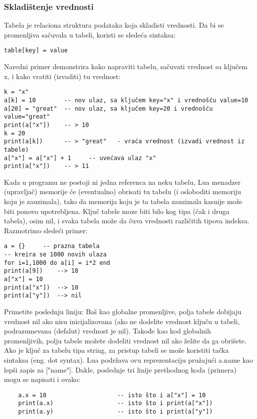 \documentclass[a4paper]{article}
\begin{document}
\subsubsection{Skladištenje vrednosti}
Tabela je relaciona struktura podataka koja skladisti vrednosti. Da bi se promenljiva sačuvala u tabeli, koristi se sledeća sintaksa:
\begin{verbatim}
table[key] = value
\end{verbatim}
Naredni primer demonstrira kako napraviti tabelu, sačuvati vrednost sa ključem x, i kako vratiti (izvaditi) tu vrednost:
\begin{verbatim}
k = "x"
a[k] = 10        -- nov ulaz, sa ključem key="x" i vrednošću value=10
a[20] = "great"  -- nov ulaz, sa ključem key=20 i vrednošću value="great"
print(a["x"])    -- > 10
k = 20
print(a[k])      -- > "great"	- vraća vrednost (izvadi vrednost iz tabele)
a["x"] = a["x"] + 1     -- uvećava ulaz "x"
print(a["x"])    -- > 11
\end{verbatim}
Kada u programu ne postoji ni jedna referenca na neku tabelu, Lua menadzer (upravljač) memorije će (eventualno) obrisati tu tabelu (i osloboditi memoriju koju je zauzimala), tako da memorija koju je ta tabela zauzimala kasnije može biti ponovo upotrebljena.
Ključ tabele moze biti bilo kog tipa (čak i druga tabela), osim nil, i svaka tabela može da čuva vrednosti različitih tipova indeksa. Razmotrimo sledeći primer:
\begin{verbatim}
a = {}     -- prazna tabela
-- kreira se 1000 novih ulaza
for i=1,1000 do a[i] = i*2 end
print(a[9])    --> 18
a["x"] = 10
print(a["x"])  --> 10
print(a["y"])  --> nil
\end{verbatim}
Primetite poslednju liniju: Baš kao globalne promenljive, polja tabele dobijaju vrednost nil ako nisu inicijalizovana (ako ne dodelite vrednost ključu u tabeli, podrazumevana (defalut) vrednost je nil). Takođe kao kod globalnih promenljivih, polju tabele možete dodeliti vrednost nil ako želite da ga obrišete.
Ako je ključ za tabelu tipa string, za pristup tabeli se može koristiti tačka sintaksa (eng. dot syntax). Lua podržava ovu reprezentaciju pružajući a.name kao lepši zapis za ["name"]. Dakle, poslednje tri linije prethodnog koda (primera) mogu se napisati i ovako:
\begin{verbatim}
    a.x = 10                    -- isto što i a["x"] = 10
    print(a.x)                  -- isto što i print(a["x"])
    print(a.y)                  -- isto što i print(a["y"])
\end{verbatim}
\end{document}
